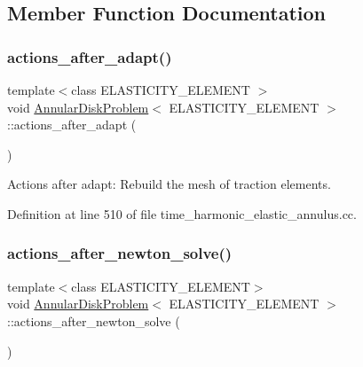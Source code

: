 \subsection{Member Function Documentation}
\mbox{\label{classAnnularDiskProblem_a491ee3537f3b08d9a10942c4744d8d2b}} 
\subsubsection{\texorpdfstring{actions\+\_\+after\+\_\+adapt()}{actions\_after\_adapt()}}
{\footnotesize\ttfamily template$<$class E\+L\+A\+S\+T\+I\+C\+I\+T\+Y\+\_\+\+E\+L\+E\+M\+E\+NT $>$ \\
void \hyperlink{classAnnularDiskProblem}{Annular\+Disk\+Problem}$<$ E\+L\+A\+S\+T\+I\+C\+I\+T\+Y\+\_\+\+E\+L\+E\+M\+E\+NT $>$\+::actions\+\_\+after\+\_\+adapt (\begin{DoxyParamCaption}{ }\end{DoxyParamCaption})}



Actions after adapt\+: Rebuild the mesh of traction elements. 



Definition at line 510 of file time\+\_\+harmonic\+\_\+elastic\+\_\+annulus.\+cc.

\mbox{\label{classAnnularDiskProblem_a35d3a481c66849a57b9797c2338b8fc2}} 
\subsubsection{\texorpdfstring{actions\+\_\+after\+\_\+newton\+\_\+solve()}{actions\_after\_newton\_solve()}}
{\footnotesize\ttfamily template$<$class E\+L\+A\+S\+T\+I\+C\+I\+T\+Y\+\_\+\+E\+L\+E\+M\+E\+NT$>$ \\
void \hyperlink{classAnnularDiskProblem}{Annular\+Disk\+Problem}$<$ E\+L\+A\+S\+T\+I\+C\+I\+T\+Y\+\_\+\+E\+L\+E\+M\+E\+NT $>$\+::actions\+\_\+after\+\_\+newton\+\_\+solve (\begin{DoxyParamCaption}{ }\end{DoxyParamCaption})\hspace{0.3cm}{\ttfamily [inline]}}



